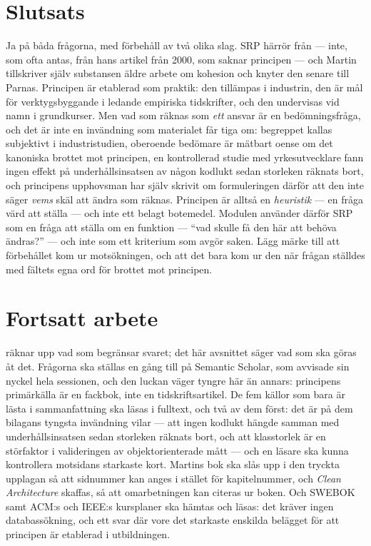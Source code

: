 \section{Slutsats}
\label{sec:srp-slutsats}

Ja på båda frågorna, med förbehåll av två olika slag.  SRP härrör från
\textcite{Martin2003Agile} --- inte, som ofta antas, från hans artikel
från 2000, som saknar principen --- och Martin tillskriver själv
substansen äldre arbete om kohesion och knyter den senare till Parnas.
Principen är etablerad som praktik: den tillämpas i industrin, den är mål
för verktygsbyggande i ledande empiriska tidskrifter, och den undervisas
vid namn i grundkurser.  Men vad som räknas som \emph{ett} ansvar är en
bedömningsfråga, och det är inte en invändning som materialet får tiga om:
begreppet kallas subjektivt i industristudien, oberoende bedömare är
mätbart oense om det kanoniska brottet mot principen, en kontrollerad
studie med yrkesutvecklare fann ingen effekt på underhållsinsatsen av
någon kodlukt sedan storleken räknats bort, och principens upphovsman
har själv skrivit om formuleringen därför att den inte säger \emph{vems}
skäl att ändra som räknas.  Principen är alltså en \emph{heuristik} ---
en fråga värd att ställa --- och inte ett belagt botemedel.  Modulen använder därför SRP som
en fråga att ställa om en funktion --- \enquote{vad skulle få den här att
behöva ändras?} --- och inte som ett kriterium som avgör saken.  Lägg
märke till att förbehållet kom ur motsökningen, och att det bara kom ur
den när frågan ställdes med fältets egna ord för brottet mot principen.

\section{Fortsatt arbete}
\label{sec:srp-fortsatt}

 räknar upp vad som begränsar svaret; det här
avsnittet säger vad som ska göras åt det.  Frågorna ska ställas en gång
till på Semantic Scholar, som avvisade sin nyckel hela sessionen, och
den luckan väger tyngre här än annars: principens primärkälla är en
fackbok, inte en tidskriftsartikel.  De fem källor som bara är lästa i
sammanfattning ska läsas i
fulltext\autocite{Ampatzoglou2019Applying,Olbrich2010Areall,
  Cabezas2020Using,Sjoberg2013Quantifying,ElEmam2001Confounding}, och två
av dem först: det är på dem bilagans tyngsta invändning vilar --- att
ingen kodlukt hängde samman med underhållsinsatsen sedan storleken
räknats bort, och att klasstorlek är en störfaktor i valideringen av
objektorienterade mått --- och en läsare ska kunna kontrollera motsidans
starkaste kort.  Martins bok ska slås upp i den tryckta upplagan så att
sidnummer kan anges i stället för kapitelnummer, och \emph{Clean
Architecture} skaffas, så att omarbetningen kan citeras ur boken.  Och
SWEBOK samt ACM:s och IEEE:s kursplaner ska hämtas och läsas: det kräver
ingen databassökning, och ett svar där vore det starkaste enskilda
belägget för att principen är etablerad i utbildningen.

